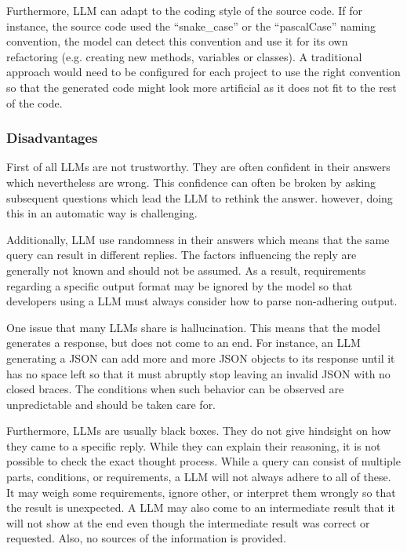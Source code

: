 Furthermore, \ac{LLM} can adapt to the coding style of the source code. If for instance, the source code used the \enquote{snake\_case} or the \enquote{pascalCase} naming convention, the model can detect this convention and use it for its own refactoring (e.g. creating new methods, variables or classes). A traditional approach would need to be configured for each project to use the right convention so that the generated code might look more artificial as it does not fit to the rest of the code.


\subsubsection{Disadvantages}

First of all \ac{LLM}s are not trustworthy. They are often confident in their answers which nevertheless are wrong. This confidence can often be broken by asking subsequent questions which lead the \ac{LLM} to rethink the answer. however, doing this in an automatic way is challenging. \cite{azaria2023internal}

Additionally, \ac{LLM} use randomness in their answers which means that the same query can result in different replies. The factors influencing the reply are generally not known and should not be assumed. As a result, requirements regarding a specific output format may be ignored by the model so that developers using a \ac{LLM} must always consider how to parse non-adhering output.  \cite{hu2023large}

One issue that many \acp{LLM} share is hallucination. This means that the model generates a response, but does not come to an end. For instance, an \ac{LLM} generating a \ac{JSON} can add more and more \ac{JSON} objects to its response until it has no space left so that it must abruptly stop leaving an invalid \ac{JSON} with no closed braces.  The conditions when such behavior can be observed are unpredictable and should be taken care for. 

Furthermore, \ac{LLM}s are usually black boxes. They do not give hindsight on how they came to a specific reply. While they can explain their reasoning, it is not possible to check the exact thought process.
While a query can consist of multiple parts, conditions, or requirements, a \ac{LLM} will not always adhere to all of these. It may weigh some requirements, ignore other, or interpret them wrongly so that the result is unexpected. A \ac{LLM} may also come to an intermediate result that it will not show at the end even though the intermediate result was correct or requested. Also, no sources of the information is provided. \cite{chen2023instructzero}

